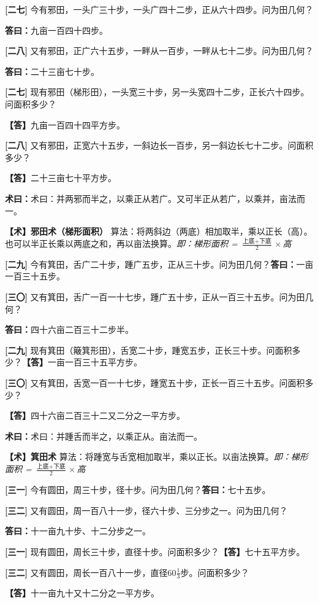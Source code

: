 \documentclass[10pt,a4paper]{article}
\newlength{\lw}
\newlength{\rw}
\newcommand{\bilingc}[2]{%
  \par\vspace{0.1em}%
  \noindent\begin{minipage}[t]{\lw}
  {\small #1}
  \end{minipage}%
  \hfill%
  \begin{minipage}[t]{\rw}
  {\small #2}
  \end{minipage}%
  \vspace{0.1em}%
}
\newcommand{\da}{\textbf{\textcolor{answercolor}{答曰：}}}
\newcommand{\daB}{\textbf{\textcolor{answercolor}{【答】}}}
\newcommand{\shu}{\textbf{\textcolor{methodcolor}{术曰：}}}
\newcommand{\shuB}{\textbf{\textcolor{methodcolor}{【术】}}}
\newcommand{\pn}[1]{\textbf{[#1]}}
\newcommand{\sk}{\vspace{0.1em}}
\begin{document}
\vspace{0.3em}

\bilingc{
\pn{二七} 今有邪田，一头广三十步，一头广四十二步，正从六十四步。问为田几何？

\da 九亩一百四十四步。

\pn{二八} 又有邪田，正广六十五步，一畔从一百步，一畔从七十二步。问为田几何？

\da 二十三亩七十步。
}{
\pn{二七} 现有邪田（梯形田），一头宽三十步，另一头宽四十二步，正长六十四步。问面积多少？

\daB 九亩一百四十四平方步。

\pn{二八} 又有邪田，正宽六十五步，一斜边长一百步，另一斜边长七十二步。问面积多少？

\daB 二十三亩七十平方步。
}

\sk

\bilingc{
\shu 术曰：并两邪而半之，以乘正从若广。又可半正从若广，以乘并，亩法而一。
}{
\shuB \textbf{邪田术（梯形面积）} 算法：将两斜边（两底）相加取半，乘以正长（高）。也可以半正长乘以两底之和，再以亩法换算。\textit{即：梯形面积 = $\frac{\text{上底}+\text{下底}}{2}\times$高}
}

\vspace{0.3em}

\bilingc{
\pn{二九} 今有箕田，舌广二十步，踵广五步，正从三十步。问为田几何？\quad\da 一亩一百三十五步。

\pn{三〇} 又有箕田，舌广一百一十七步，踵广五十步，正从一百三十五步。问为田几何？

\da 四十六亩二百三十二步半。
}{
\pn{二九} 现有箕田（簸箕形田），舌宽二十步，踵宽五步，正长三十步。问面积多少？\quad\daB 一亩一百三十五平方步。

\pn{三〇} 又有箕田，舌宽一百一十七步，踵宽五十步，正长一百三十五步。问面积多少？

\daB 四十六亩二百三十二又二分之一平方步。
}

\sk

\bilingc{
\shu 术曰：并踵舌而半之，以乘正从。亩法而一。
}{
\shuB \textbf{箕田术} 算法：将踵宽与舌宽相加取半，乘以正长。以亩法换算。\textit{即：梯形面积 = $\frac{\text{上底}+\text{下底}}{2}\times$高}
}

\vspace{0.3em}

\bilingc{
\pn{三一} 今有圆田，周三十步，径十步。问为田几何？\quad\da 七十五步。

\pn{三二} 又有圆田，周一百八十一步，径六十步、三分步之一。问为田几何？

\da 十一亩九十步、十二分步之一。
}{
\pn{三一} 现有圆田，周长三十步，直径十步。问面积多少？\quad\daB 七十五平方步。

\pn{三二} 又有圆田，周长一百八十一步，直径$60\frac{1}{3}$步。问面积多少？

\daB 十一亩九十又十二分之一平方步。
}
\end{document}
